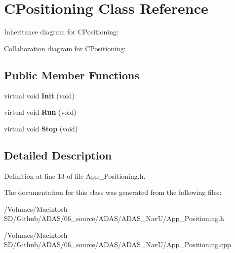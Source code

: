 \hypertarget{class_c_positioning}{}\section{C\+Positioning Class Reference}
\label{class_c_positioning}


Inheritance diagram for C\+Positioning\+:


Collaboration diagram for C\+Positioning\+:
\subsection*{Public Member Functions}
\begin{DoxyCompactItemize}
\item 
\mbox{\label{class_c_positioning_abdceba66e701554a178acf61c61b0df6}} 
virtual void {\bfseries Init} (void)
\item 
\mbox{\label{class_c_positioning_ad0e439dcc95c450548c2806077aeff57}} 
virtual void {\bfseries Run} (void)
\item 
\mbox{\label{class_c_positioning_a2706c9bb6bb52201c279386fd2c9dd89}} 
virtual void {\bfseries Stop} (void)
\end{DoxyCompactItemize}


\subsection{Detailed Description}


Definition at line 13 of file App\+\_\+\+Positioning.\+h.



The documentation for this class was generated from the following files\+:\begin{DoxyCompactItemize}
\item 
/\+Volumes/\+Macintosh S\+D/\+Github/\+A\+D\+A\+S/06\+\_\+source/\+A\+D\+A\+S/\+A\+D\+A\+S\+\_\+\+Nav\+U/App\+\_\+\+Positioning.\+h\item 
/\+Volumes/\+Macintosh S\+D/\+Github/\+A\+D\+A\+S/06\+\_\+source/\+A\+D\+A\+S/\+A\+D\+A\+S\+\_\+\+Nav\+U/App\+\_\+\+Positioning.\+cpp\end{DoxyCompactItemize}
